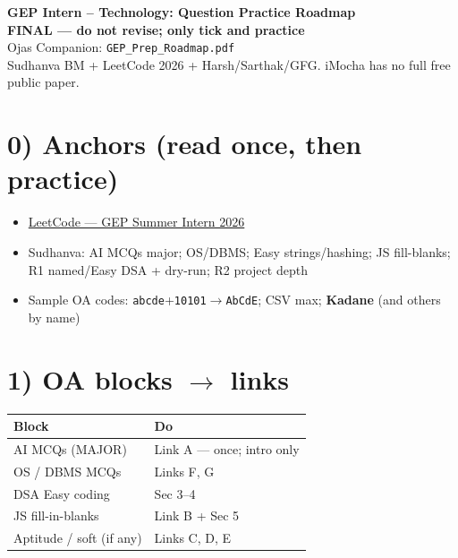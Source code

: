 \documentclass[a4paper,9pt]{extarticle}
\begin{document}
\begin{center}
  {\LARGE\textbf{GEP Intern -- Technology: Question Practice Roadmap}}\\[0.5pt]
  {\small\color{hot}\textbf{FINAL --- do not revise; only tick and practice}}\\[1pt]
  {\small Ojas \textbar{} Companion: \texttt{GEP\_Prep\_Roadmap.pdf}}\\[0.5pt]
  {\footnotesize\color{muted}
  Sudhanva BM + LeetCode 2026 + Harsh/Sarthak/GFG. iMocha has no full free public paper.}
\end{center}

\section{0) Anchors (read once, then practice)}
\begin{itemize}
  \item \href{https://leetcode.com/discuss/post/7161376/gep-worldwide-summer-internship-intervie-dvv5/}{LeetCode --- GEP Summer Intern 2026}
  \item Sudhanva: AI MCQs major; OS/DBMS; Easy strings/hashing; JS fill-blanks; R1 named/Easy DSA + dry-run; R2 project depth
  \item Sample OA codes: \texttt{abcde}+\texttt{10101}$\to$\texttt{AbCdE}; CSV max; \textbf{Kadane} (and others by name)
\end{itemize}

\section{1) OA blocks $\to$ links}
\noindent\begin{tabularx}{\textwidth}{@{}l X@{}}
\textbf{Block} & \textbf{Do} \\
\hline
AI MCQs (MAJOR) & Link A --- once; intro only \\
OS / DBMS MCQs & Links F, G \\
DSA Easy coding & Sec 3--4 \\
JS fill-in-blanks & Link B + Sec 5 \\
Aptitude / soft (if any) & Links C, D, E \\
\end{tabularx}
\end{document}
